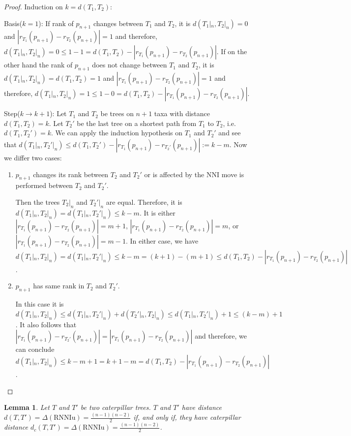 \documentclass[11pt, a4paper]{article}
\newcommand{\nni}{\mathrm{NNI}}
\newcommand{\rnniu}{\mathrm{RNNIu}}
\newtheorem{lemma}[definition]{Lemma}
\begin{document}
\begin{proof}
    Induction on $k = d(T_1,T_2)$:

    Basis($k = 1$):
    If rank of $p_{n+1}$ changes between $T_1$ and $T_2$, it is $d(T_1|_n, T_2|_n) = 0$ and $|r_{T_1}(p_{n+1}) - r_{T_2}(p_{n+1})| = 1$ and therefore, $d(T_1|_n, T_2|_n) = 0 \leq 1 - 1 = d(T_1,T_2) - |r_{T_1}(p_{n+1}) - r_{T_2}(p_{n+1})|$.
    If on the other hand the rank of $p_{n+1}$ does not change between $T_1$ and $T_2$, it is $d(T_1|_n, T_2|_n) = d(T_1,T_2) = 1$ and $|r_{T_1}(p_{n+1}) - r_{T_2}(p_{n+1})| = 1$ and therefore, $d(T_1|_n, T_2|_n) = 1 \leq 1 - 0 = d(T_1,T_2) - |r_{T_1}(p_{n+1}) - r_{T_2}(p_{n+1})|$.

    Step($k \to k+1$):
    Let $T_1$ and $T_2$ be trees on $n+1$ taxa with distance $d(T_1,T_2) = k$.
    Let $T_2'$ be the last tree on a shortest path from $T_1$ to $T_2$, i.e. $d(T_1,T_2') = k$.
    We can apply the induction hypothesis on $T_1$ and $T_2'$ and see that $d(T_1|_n, T_2'|_n) \leq d(T_1, T_2') - |r_{T_1}(p_{n+1}) - r_{T_2'}(p_{n+1})| := k - m$.
    Now we differ two cases:
    \begin{enumerate}
        \item $p_{n+1}$ changes its rank between $T_2$ and $T_2'$ or is affected by the $\nni$ move is performed between $T_2$ and $T_2'$.

        Then the trees $T_2|_n$ and $T_2'|_n$ are equal. 
        Therefore, it is $d(T_1|_n,T_2|_n) = d(T_1|_n, T_2'|_n) \leq k - m$.
        It is either $|r_{T_1}(p_{n+1}) - r_{T_2}(p_{n+1})| = m+1$, $|r_{T_1}(p_{n+1}) - r_{T_2}(p_{n+1})| = m$, or $|r_{T_1}(p_{n+1}) - r_{T_2}(p_{n+1})| = m-1$.
        In either case, we have $d(T_1|_n,T_2|_n) = d(T_1|_n, T_2'|_n) \leq k - m = (k+1) - (m+1) \leq d(T_1, T_2) - |r_{T_1}(p_{n+1}) - r_{T_2}(p_{n+1})|$.

        \item $p_{n+1}$ has same rank in $T_2$ and $T_2'$.

        In this case it is $d(T_1|_n,T_2|_n) \leq d(T_1|_n,T_2'|_n) + d(T_2'|_n, T_2|_n) \leq d(T_1|_n, T_2'|_n) + 1 \leq (k-m)+ 1$.
        It also follows that $|r_{T_1}(p_{n+1}) - r_{T_2'}(p_{n+1})| = |r_{T_1}(p_{n+1}) - r_{T_2}(p_{n+1})|$ and therefore, we can conclude $d(T_1|_n,T_2|_n) \leq k-m+1 = k+1-m = d(T_1,T_2) -  |r_{T_1}(p_{n+1}) - r_{T_2}(p_{n+1})|$.
    \end{enumerate}
\end{proof}


\begin{lemma}
    Let $T$ and $T'$ be two caterpillar trees.
    $T$ and $T'$ have distance $d(T,T') = \Delta(\rnniu) = \frac{(n-1)(n-2)}{2}$ if, and only if, they have caterpillar distance $d_c(T,T') = \Delta(\rnniu) = \frac{(n-1)(n-2)}{2}$. 
    \label{lemma:caterpillar_dist=diameter}
\end{lemma}
\end{document}
